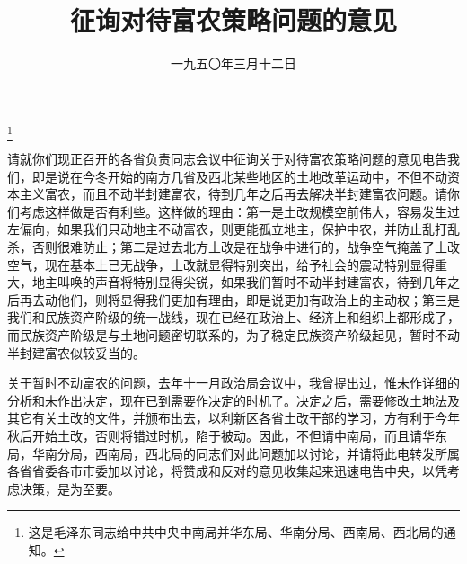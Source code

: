 
\title{征询对待富农策略问题的意见}
\date{一九五〇年三月十二日}
\thanks{这是毛泽东同志给中共中央中南局并华东局、华南分局、西南局、西北局的通知。}
\maketitle


请就你们现正召开的各省负责同志会议中征询关于对待富农策略问题的意见电告我们，即是说在今冬开始的南方几省及西北某些地区的土地改革运动中，不但不动资本主义富农，而且不动半封建富农，待到几年之后再去解决半封建富农问题。请你们考虑这样做是否有利些。这样做的理由：第一是土改规模空前伟大，容易发生过左偏向，如果我们只动地主不动富农，则更能孤立地主，保护中农，并防止乱打乱杀，否则很难防止；第二是过去北方土改是在战争中进行的，战争空气掩盖了土改空气，现在基本上已无战争，土改就显得特别突出，给予社会的震动特别显得重大，地主叫唤的声音将特别显得尖锐，如果我们暂时不动半封建富农，待到几年之后再去动他们，则将显得我们更加有理由，即是说更加有政治上的主动权；第三是我们和民族资产阶级的统一战线，现在已经在政治上、经济上和组织上都形成了，而民族资产阶级是与土地问题密切联系的，为了稳定民族资产阶级起见，暂时不动半封建富农似较妥当的。

关于暂时不动富农的问题，去年十一月政治局会议中，我曾提出过，惟未作详细的分析和未作出决定，现在已到需要作决定的时机了。决定之后，需要修改土地法及其它有关土改的文件，并颁布出去，以利新区各省土改干部的学习，方有利于今年秋后开始土改，否则将错过时机，陷于被动。因此，不但请中南局，而且请华东局，华南分局，西南局，西北局的同志们对此问题加以讨论，并请将此电转发所属各省省委各市市委加以讨论，将赞成和反对的意见收集起来迅速电告中央，以凭考虑决策，是为至要。

